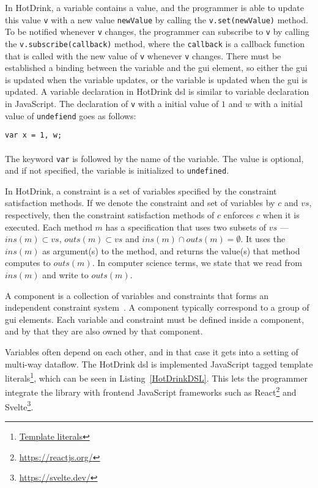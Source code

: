 In HotDrink, a variable contains a value, and the programmer is able to update this value \texttt{v} with a new value \texttt{newValue} by calling the \texttt{v.set(newValue)} method. To be notified whenever \texttt{v} changes, the programmer can subscribe to \texttt{v} by calling the \texttt{v.subscribe(callback)} method, where the \texttt{callback} is a callback function that is called with the new value of \texttt{v} whenever \texttt{v} changes. There must be established a binding between the variable and the \gls{gui} element, so either the \gls{gui} is updated when the variable updates, or the variable is updated when the \gls{gui} is updated. A variable declaration in HotDrink \gls{dsl} is similar to variable declaration in JavaScript. The declaration of \texttt{v} with a initial value of $1$ and $w$ with a initial value of \texttt{undefiend} goes as follows: 

\texttt{var x = 1, w;}\\\\
The keyword \texttt{var} is followed by the name of the variable. The value is optional, and if not specified, the variable is initialized to \texttt{undefined}. 

In HotDrink, a constraint is a set of variables specified by the constraint satisfaction methods. If we denote the constraint and set of variables by $c$ and $vs$, respectively, then the constraint satisfaction methods of $c$ enforces $c$ when it is executed. Each method $m$ has a specification that uses two subsets of $vs$ --- $ins(m) \subset vs$, $outs(m) \subset vs$ and $ins(m) \cap outs(m) = \emptyset$. It uses the $ins(m)$ as argument(s) to the method, and returns the value(s) that method computes to $outs(m)$. In computer science terms, we state that we read from $ins(m)$ and write to $outs(m)$.

A component is a collection of variables and constraints that forms an independent constraint system~\cite{svartveit2021multithreaded}. A component typically correspond to a group of \gls{gui} elements. Each variable and constraint must be defined inside a component, and by that they are also owned by that component. 

Variables often depend on each other, and in that case it gets into a setting of multi-way dataflow. The HotDrink \gls{dsl} is implemented JavaScript tagged template literals\footnote{\href{https://developer.mozilla.org/en-US/docs/Web/JavaScript/Reference/Template_literals}{Template literals}}, which can be seen in Listing~\ref{HotDrinkDSL}. This lets the programmer integrate the library with frontend JavaScript frameworks such as React\footnote{\url{https://reactjs.org/}} and Svelte\footnote{\url{https://svelte.dev/}}. 

